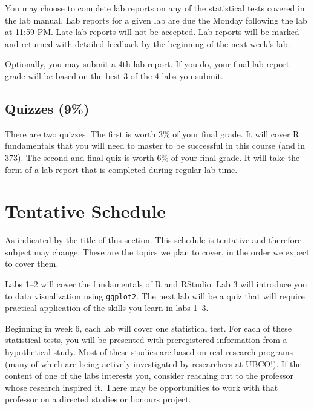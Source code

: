 \documentclass[
]{book}
\begin{document}
You may choose to complete lab reports on any of the statistical tests covered in the lab manual. Lab reports for a given lab are due the Monday following the lab at 11:59 PM. Late lab reports will not be accepted. Lab reports will be marked and returned with detailed feedback by the beginning of the next week's lab.

Optionally, you may submit a 4th lab report. If you do, your final lab report grade will be based on the best 3 of the 4 labs you submit.

\hypertarget{quizzes-9}{%
\subsection*{Quizzes (9\%)}\label{quizzes-9}}

There are two quizzes. The first is worth 3\% of your final grade. It will cover R fundamentals that you will need to master to be successful in this course (and in 373). The second and final quiz is worth 6\% of your final grade. It will take the form of a lab report that is completed during regular lab time.

\hypertarget{tentative-schedule}{%
\section*{Tentative Schedule}\label{tentative-schedule}}

As indicated by the title of this section. This schedule is tentative and therefore subject may change. These are the topics we plan to cover, in the order we expect to cover them.

Labs 1--2 will cover the fundamentals of R and RStudio. Lab 3 will introduce you to data visualization using \texttt{ggplot2}. The next lab will be a quiz that will require practical application of the skills you learn in labs 1--3.

Beginning in week 6, each lab will cover one statistical test. For each of these statistical tests, you will be presented with preregistered information from a hypothetical study. Most of these studies are based on real research programs (many of which are being actively investigated by researchers at UBCO!). If the content of one of the labs interests you, consider reaching out to the professor whose research inspired it. There may be opportunities to work with that professor on a directed studies or honours project.
\end{document}
